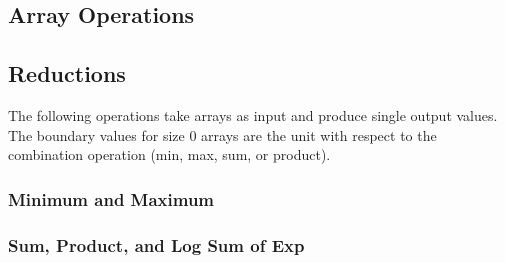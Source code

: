 \begin{description}
\begin{description}
\begin{description}
\begin{description}
\begin{description}
\begin{description}
\begin{description}
\begin{description}
\begin{description}
\begin{description}
\begin{description}
\begin{description}
\begin{description}
\begin{description}
\begin{description}
\begin{description}
\begin{description}
\begin{description}
\begin{description}
\begin{description}
\begin{description}
\begin{description}
\begin{description}
\begin{description}
\begin{description}
\chapter{Array Operations}

\section{Reductions}

The following operations take arrays as input and produce single output values.  The boundary values for size 0 arrays are the unit with respect to the combination operation (min, max, sum, or product).

\subsection{Minimum and Maximum}

\begin{description}  %

\subsection{Sum, Product, and Log Sum of Exp}


\end{description}
\end{description}
\end{description}
\end{description}
\end{description}
\end{description}
\end{description}
\end{description}
\end{description}
\end{description}
\end{description}
\end{description}
\end{description}
\end{description}
\end{description}
\end{description}
\end{description}
\end{description}
\end{description}
\end{description}
\end{description}
\end{description}
\end{description}
\end{description}
\end{description}
\end{description}
